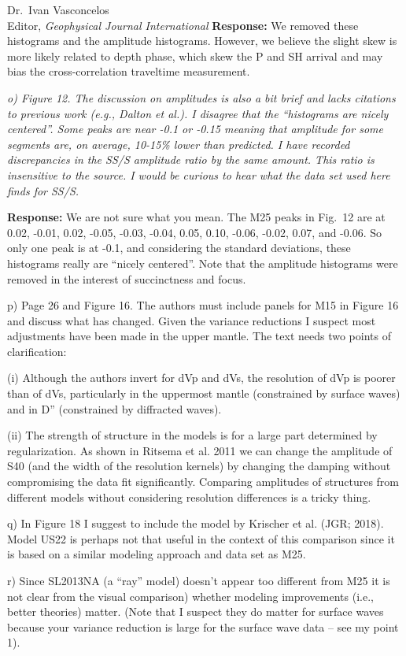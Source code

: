 \documentclass[11pt,a4paper]{letter}
\newcommand{\response}[1]{\textbf{Response:} #1}
\newcommand{\rev}[1]{{\it{#1}}}
\begin{document}
\begin{letter}{Dr.~Ivan Vasconcelos\\
Editor, \textit{Geophysical Journal International}}
\response{We removed these histograms and the amplitude histograms. However, we believe the slight skew is more likely related to depth phase, which skew the P and SH arrival and may bias the cross-correlation traveltime measurement.}

\rev{o) Figure 12. The discussion on amplitudes is also a bit brief and lacks citations to previous work (e.g., Dalton et al.).
I disagree that the ``histograms are nicely centered''. Some peaks are near -0.1 or -0.15 meaning that amplitude for some segments are, on average, 10-15\% lower than predicted. I have recorded discrepancies in the SS/S amplitude ratio by the same amount.
This ratio is insensitive to the source. I would be curious to hear what the data set used here finds for SS/S.
}

\response{We are not sure what you mean. The M25 peaks in Fig.~12 are at 0.02, -0.01, 0.02, -0.05, -0.03, -0.04, 0.05, 0.10, -0.06, -0.02, 0.07, and -0.06. So only one peak is at -0.1, and considering the standard deviations, these histograms really are ``nicely centered''.
Note that the amplitude histograms were removed in the interest of succinctness and focus.}

\rev{p) Page 26 and Figure 16. The authors must include panels for M15 in Figure 16 and discuss what has changed.
Given the variance reductions I suspect most adjustments have been made in the upper mantle. The text needs two points of clarification:

(i) Although the authors invert for dVp and dVs, the resolution of dVp is poorer than of dVs, particularly in the uppermost mantle (constrained by surface waves) and in D'' (constrained by diffracted waves).

(ii) The strength of structure in the models is for a large part determined by regularization. As shown in Ritsema et al. 2011 we can change the amplitude of S40 (and the width of the resolution kernels) by changing the damping without compromising the data fit significantly. Comparing amplitudes of structures from different models without considering resolution differences is a tricky thing.

q) In Figure 18 I suggest to include the model by Krischer et al. (JGR; 2018). Model US22 is perhaps not that useful in the context of this comparison since it is based on a similar modeling approach and data set as M25.

r) Since SL2013NA (a ``ray'' model) doesn't appear too different from M25 it is not clear from the visual comparison) whether modeling improvements (i.e., better theories) matter.
(Note that I suspect they do matter for surface waves because your variance reduction is large for the surface wave data -- see my point 1).

}
\end{letter}
\end{document}
